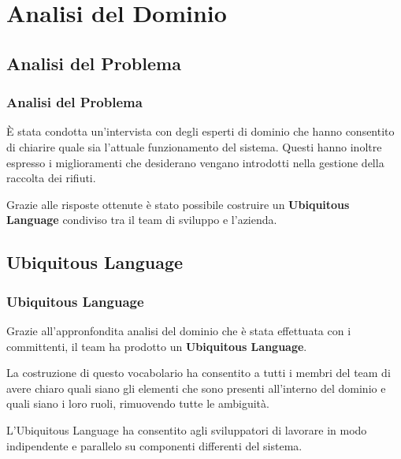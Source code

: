 \section{Analisi del Dominio}
\frame{\tableofcontents[currentsection]}

\subsection{Analisi del Problema}

\begin{frame}
    \frametitle{Analisi del Problema}
    È stata condotta un'intervista con degli esperti di dominio che hanno consentito di chiarire quale sia l'attuale
    funzionamento del sistema.
    Questi hanno inoltre espresso i miglioramenti che desiderano vengano introdotti nella gestione della raccolta dei
    rifiuti.

    \bigskip

    Grazie alle risposte ottenute è stato possibile costruire un \textbf{Ubiquitous Language} condiviso tra il team di sviluppo
    e l'azienda.

\end{frame}

\subsection{Ubiquitous Language}

\begin{frame}
    \frametitle{Ubiquitous Language}
    Grazie all'appronfondita analisi del dominio che è stata effettuata con i committenti, il team ha prodotto un
    \textbf{Ubiquitous Language}.

    \bigskip

    La costruzione di questo vocabolario ha consentito a tutti i membri del team di avere chiaro quali siano gli
    elementi che sono presenti all'interno del dominio e quali siano i loro ruoli, rimuovendo tutte le ambiguità.

    \bigskip

    L'Ubiquitous Language ha consentito agli sviluppatori di lavorare in modo indipendente e parallelo su componenti
    differenti del sistema.

\end{frame}


